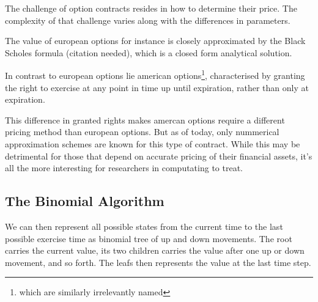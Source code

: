 The challenge of option contracts resides in how to determine their price. The
complexity of that challenge varies along with the differences in parameters.

The value of european options for instance is closely approximated by the Black
Scholes formula (citation needed), which is a closed form analytical solution.

In contrast to european options lie american options\footnote{which are
similarly irrelevantly named}, characterised by granting the right to exercise
at any point in time up until expiration, rather than only at expiration.

This difference in granted rights makes amercan options require a different
pricing method than european options. But as of today, only nummerical
approximation schemes are known for this type of contract. While this may be
detrimental for those that depend on accurate pricing of their financial
assets, it's all the more interesting for researchers in computating to treat.

\subsection{The Binomial Algorithm}


We can then represent all possible states from the current time to the
last possible exercise time as binomial tree of up and down
movements. The root carries the current value, its two children
carries the value after one up or down movement, and so forth. The
leafs then represents the value at the last time step.

